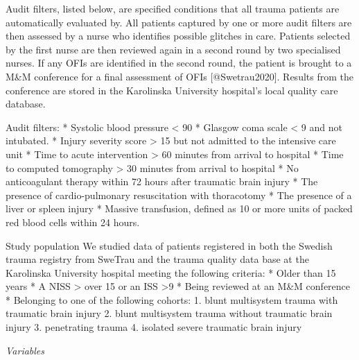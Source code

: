 \documentclass[
]{article}
\begin{document}
Audit filters, listed below, are specified conditions that all trauma
patients are automatically evaluated by. All patients captured by one or
more audit filters are then assessed by a nurse who identifies possible
glitches in care. Patients selected by the first nurse are then reviewed
again in a second round by two specialised nurses. If any OFIs are
identified in the second round, the patient is brought to a M\&M
conference for a final assessment of OFIs {[}@Swetrau2020{]}. Results
from the conference are stored in the Karolinska University hospital's
local quality care database.

Audit filters: * Systolic blood pressure \textless{} 90 * Glasgow coma
scale \textless{} 9 and not intubated. * Injury severity score
\textgreater{} 15 but not admitted to the intensive care unit * Time to
acute intervention \textgreater{} 60 minutes from arrival to hospital *
Time to computed tomography \textgreater{} 30 minutes from arrival to
hospital * No anticoagulant therapy within 72 hours after traumatic
brain injury * The presence of cardio-pulmonary resuscitation with
thoracotomy * The presence of a liver or spleen injury * Massive
transfusion, defined as 10 or more units of packed red blood cells
within 24 hours.

Study population We studied data of patients registered in both the
Swedish trauma registry from SweTrau and the trauma quality data base at
the Karolinska University hospital meeting the following criteria: *
Older than 15 years * A NISS \textgreater{} over 15 or an ISS
\textgreater9 * Being reviewed at an M\&M conference * Belonging to one
of the following cohorts: 1. blunt multisystem trauma with traumatic
brain injury 2. blunt multisystem trauma without traumatic brain injury
3. penetrating trauma 4. isolated severe traumatic brain injury

\emph{Variables}
\end{document}
